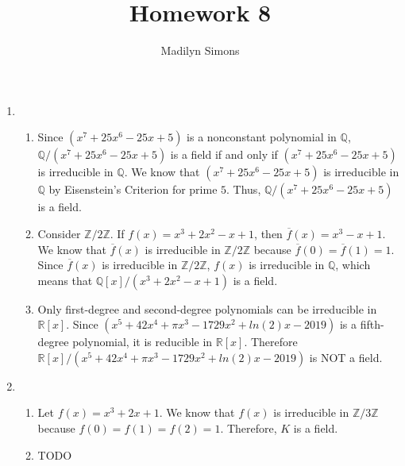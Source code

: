\documentclass{article}
\title{Homework 8}
\author{Madilyn Simons}
\date{}
\begin{document}
\maketitle

\begin{enumerate}

\item
\begin{enumerate}

\item Since $(x^7 + 25x^6 - 25x + 5)$ is a nonconstant polynomial in
$\mathbb{Q}$, $\mathbb{Q}/(x^7 + 25x^6 - 25x + 5)$ is a field if and only if
$(x^7 + 25x^6 - 25x + 5)$ is irreducible in $\mathbb{Q}$.  We know that
$(x^7 + 25x^6 - 25x + 5)$ is irreducible in $\mathbb{Q}$ by Eisenstein's
Criterion for prime $5$.  Thus, $\mathbb{Q}/(x^7 + 25x^6 - 25x + 5)$ is a field.

\item Consider $\mathbb{Z}/2\mathbb{Z}$.  If $f(x) = x^3 + 2x^2 - x + 1$, then
$\overline{f}(x) = x^3 - x + 1$.  We know that $\overline{f}(x)$ is
irreducible in $\mathbb{Z}/2\mathbb{Z}$ because
$\overline{f}(0) = \overline{f}(1) = 1$.  Since $\overline{f}(x)$ is
irreducible in $\mathbb{Z}/2\mathbb{Z}$, $f(x)$ is irreducible in $\mathbb{Q}$,
which means that $\mathbb{Q}[x]/(x^3 + 2x^2 - x + 1)$ is a field.

\item Only first-degree and second-degree polynomials can be irreducible in
$\mathbb{R}[x]$.  Since $(x^5 + 42x^4 + \pi x^3 -1729x^2 + ln(2)x - 2019)$
is a fifth-degree polynomial, it is reducible in $\mathbb{R}[x]$.  Therefore
$\mathbb{R}[x]/(x^5 + 42x^4 + \pi x^3 -1729x^2 + ln(2)x - 2019)$ is NOT
a field.

\end{enumerate}

\item
\begin{enumerate}
\item
Let $f(x) = x^3 + 2x + 1$.  We know that $f(x)$ is irreducible in
$\mathbb{Z}/3\mathbb{Z}$ because $f(0) = f(1) = f(2) = 1$.  Therefore,
$K$ is a field.

\item TODO

\end{enumerate}


\end{enumerate}
\end{document}
